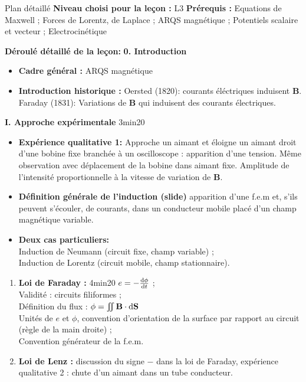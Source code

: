 \begin{reportBlock}{Plan détaillé}
  \textbf{Niveau choisi pour la leçon :} L3
  \newline
  \textbf{Prérequis : } Equations de Maxwell ; Forces de Lorentz, de Laplace ; ARQS magnétique ; Potentiels scalaire et vecteur ; Electrocinétique
  \newline
  
  \textbf{Déroulé détaillé de la leçon: }\newline
  \textbf{0. Introduction} 
  \begin{itemize}
      \item \textbf{Cadre général :} ARQS magnétique
      \item \textbf{Introduction historique :} Oersted (1820): courants éléctriques induisent $\mathbf B$. Faraday (1831): Variations de $\mathbf B$ qui induisent des courants électriques. 
  \end{itemize}
  \vspace{1cm}
  \textbf{I. Approche expérimentale} 3min20
  \begin{itemize}
      \item \textbf{Expérience qualitative 1:} Approche un aimant et éloigne un aimant droit d'une bobine fixe branchée à un oscilloscope : apparition d'une tension. Même observation avec déplacement de la bobine dans aimant fixe. Amplitude de l'intensité proportionnelle à la vitesse de variation de $\mathbf B$.
      \item \textbf{Définition générale de l'induction (slide)} apparition d'une f.e.m et, s'ils peuvent s'écouler, de courants, dans un conducteur mobile placé d'un champ magnétique variable.
      \item \textbf{Deux cas particuliers:} \\
      Induction de Neumann (circuit fixe, champ variable) ; \\ Induction de Lorentz (circuit mobile, champ stationnaire).
        \end{itemize}
\begin{enumerate}
      \item \textbf{Loi de Faraday :} 4min20 $e = - \frac{\mathrm{d} \phi}{\mathrm{d} t}$ ; \\
      Validité : circuits filiformes ; \\
      Définition du flux : $\phi = \iint \mathbf B \cdot \mathrm{d} \mathbf S$ \\
      Unités de $e$ et $\phi$, convention d'orientation de la surface par rapport au circuit (règle de la main droite) ; \\ Convention générateur de la f.e.m.
      \item \textbf{Loi de Lenz :} discussion du signe $-$ dans la loi de Faraday, expérience qualitative 2 : chute d'un aimant dans un tube conducteur.
\end{enumerate}


\end{reportBlock}
